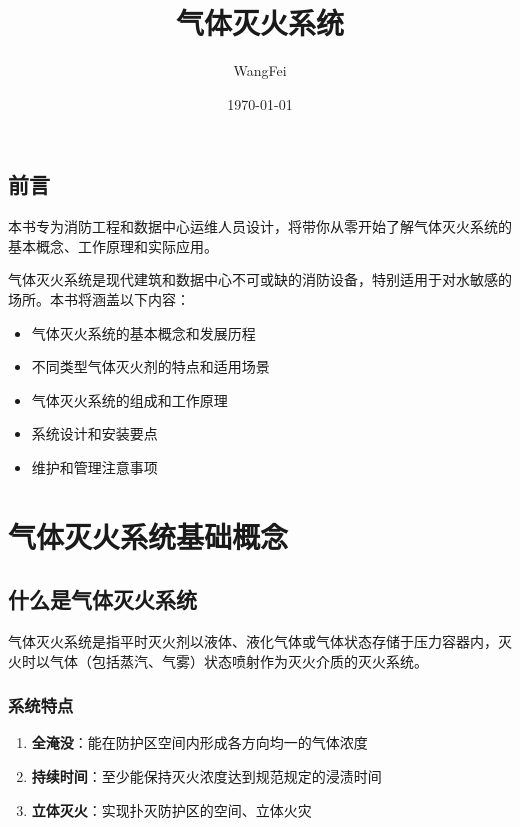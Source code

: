\documentclass[12pt,UTF8]{ctexbook}
\title{\heiti\zihao{0} 气体灭火系统}
\author{WangFei}
\date{\today}
\begin{document}
\maketitle
\tableofcontents

\frontmatter
\chapter{前言}

本书专为消防工程和数据中心运维人员设计，将带你从零开始了解气体灭火系统的基本概念、工作原理和实际应用。

气体灭火系统是现代建筑和数据中心不可或缺的消防设备，特别适用于对水敏感的场所。本书将涵盖以下内容：
\begin{itemize}
    \item 气体灭火系统的基本概念和发展历程
    \item 不同类型气体灭火剂的特点和适用场景
    \item 气体灭火系统的组成和工作原理
    \item 系统设计和安装要点
    \item 维护和管理注意事项
\end{itemize}

\mainmatter

\part{气体灭火系统基础概念}

\chapter{什么是气体灭火系统}

气体灭火系统是指平时灭火剂以液体、液化气体或气体状态存储于压力容器内，灭火时以气体（包括蒸汽、气雾）状态喷射作为灭火介质的灭火系统。

\section{系统特点}

\begin{enumerate}
    \item \textbf{全淹没}：能在防护区空间内形成各方向均一的气体浓度
    \item \textbf{持续时间}：至少能保持灭火浓度达到规范规定的浸渍时间
    \item \textbf{立体灭火}：实现扑灭防护区的空间、立体火灾
\end{enumerate}
\end{document}
